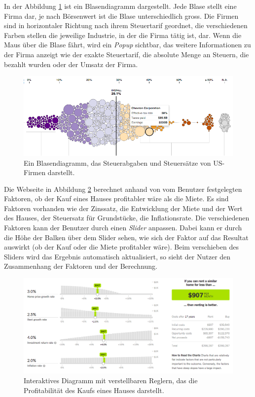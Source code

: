 In der Abbildung \ref{fig:nytimes-taxes} ist ein Blasendiagramm dargestellt. Jede Blase stellt eine Firma dar, je nach Börsenwert ist die Blase unterschiedlich gross. Die Firmen sind in horizontaler Richtung nach ihrem Steuertarif geordnet, die verschiedenen Farben stellen die jeweilige Industrie, in der die Firma tätig ist, dar. Wenn die Maus über die Blase fährt, wird ein \textit{Popup} sichtbar, das weitere Informationen zu der Firma anzeigt wie der exakte Steuertarif, die absolute Menge an Steuern, die bezahlt wurden oder der Umsatz der Firma.

\begin{figure}[!htbp]
	\centering
	\includegraphics[width=\linewidth]{images/nytimes-taxes-zugeschnitten}
	\caption[Blasendiagramm in der New York Times]{Ein Blasendiagramm, das Steuerabgaben und Steuersätze von US-Firmen darstellt. \cite{nytimes-taxes}}
	\label{fig:nytimes-taxes}
\end{figure}

Die Webseite in Abbildung \ref{fig:nytimes-realestate} berechnet anhand von vom Benutzer festgelegten Faktoren, ob der Kauf eines Hauses profitabler wäre als die Miete. Es sind Faktoren vorhanden wie der Zinssatz, die Entwicklung der Miete und der Wert des Hauses, der Steuersatz für Grundstücke, die Inflationsrate. Die verschiedenen Faktoren kann der Benutzer durch einen \textit{Slider} anpassen. Dabei kann er durch die Höhe der Balken über dem Slider sehen, wie sich der Faktor auf das Resultat auswirkt (ob der Kauf oder die Miete profitabler wäre). Beim verschieben des Sliders wird das Ergebnis automatisch aktualisiert, so sieht der Nutzer den Zusammenhang der Faktoren und der Berechnung.

\begin{figure}[!htbp]
	\centering
	\includegraphics[width=\linewidth]{images/nytimes-realestate-zugeschnitten}
	\caption[Interaktives Diagramm in der New York Times]{Interaktives Diagramm mit verstellbaren Reglern, das die Profitabilität des Kaufs eines Hauses darstellt. \cite{nytimes-realestate}}
	\label{fig:nytimes-realestate}
\end{figure}

